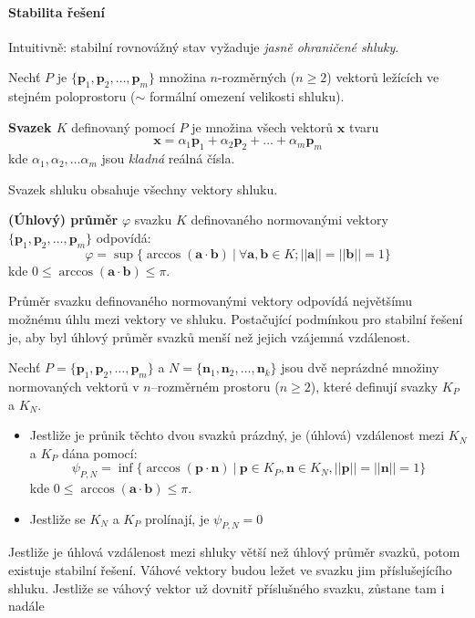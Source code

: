 \documentclass[11pt]{report} %
\renewcommand{\vec}[1]{\mathbf{#1}}
\numberwithin{equation}{section}
\begin{document}
\paragraph{Stabilita řešení}
Intuitivně: stabilní rovnovážný stav vyžaduje \textit{jasně ohraničené shluky}.

Nechť $P$ je $\{\vec{p}_1, \vec{p}_2, \dots, \vec{p}_m\}$ množina $n$-rozměrných ($n \geq 2$) vektorů ležících ve stejném poloprostoru ($\sim$ formální omezení velikosti shluku). 

\textbf{Svazek $K$} definovaný pomocí $P$ je množina všech vektorů $\vec{x}$ tvaru 
$$\vec{x} = \alpha_1\vec{p}_1 + \alpha_2\vec{p}_2 + \dots + \alpha_m\vec{p}_m$$
kde $\alpha_1, \alpha_2,\dots \alpha_m$ jsou \textit{kladná} reálná čísla.

Svazek shluku obsahuje všechny vektory  shluku. 

\textbf{(Úhlový) průměr} $\varphi$ svazku $K$ definovaného normovanými vektory $\{\vec{p}_1, \vec{p}_2, \dots, \vec{p}_m\}$ odpovídá:
$$\varphi = \sup\{\arccos(\vec{a}\cdot\vec{b})\ |\ \forall\vec{a},\vec{b} \in K; ||\vec{a}|| = ||\vec{b}|| = 1 \}$$
kde $0 \leq \arccos(\vec{a}\cdot\vec{b}) \leq \pi$.

Průměr svazku definovaného normovanými vektory odpovídá největšímu možnému úhlu mezi vektory ve shluku. Postačující podmínkou pro stabilní řešení je, aby byl úhlový průměr svazků menší než jejich vzájemná
vzdálenost.

Nechť $P = \{\vec{p}_1, \vec{p}_2, \dots, \vec{p}_m\}$ a $N = \{\vec{n}_1, \vec{n}_2, \dots, \vec{n}_k\}$ jsou dvě neprázdné množiny normovaných vektorů v $n$–rozměrném prostoru ($n \geq 2$), které definují svazky $K_P$ a $K_N$.
\begin{itemize}
	\item Jestliže je průnik těchto dvou svazků prázdný, je (úhlová) vzdálenost mezi $K_N$ a $K_P$ dána pomocí:
	$$\psi_{P,N} = \inf\{\arccos(\vec{p}\cdot\vec{n})\ |\ \vec{p} \in K_P, \vec{n} \in K_N, ||\vec{p}|| = ||\vec{n}|| = 1 \}$$
	kde $0 \leq \arccos(\vec{a}\cdot\vec{b}) \leq \pi$.
	\item Jestliže se $K_N$ a $K_P$ prolínají, je $\psi_{P,N} = 0$
\end{itemize}

Jestliže je úhlová vzdálenost mezi shluky větší než úhlový průměr svazků, potom existuje stabilní řešení.
Váhové vektory budou ležet ve svazku jim příslušejícího shluku. Jestliže se váhový vektor už  dovnitř příslušného svazku, zůstane tam i nadále
\end{document}

